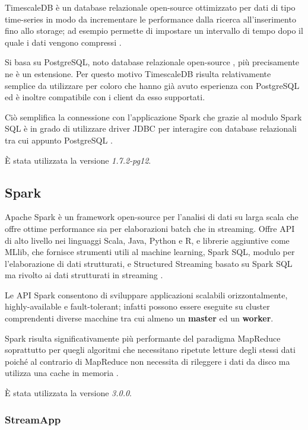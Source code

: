 TimescaleDB è un database relazionale open-source ottimizzato per dati di tipo time-series
in modo da incrementare le performance dalla ricerca
all'inserimento fino allo storage; ad esempio permette di impostare un intervallo di tempo
dopo il quale i dati vengono compressi \cite{timescale}.

Si basa su PostgreSQL, noto database relazionale open-source \cite{postgresql}, più precisamente
ne è un estensione. Per questo motivo TimescaleDB risulta relativamente semplice da utilizzare
per coloro che hanno già avuto esperienza con PostgreSQL ed è inoltre compatibile con i client
da esso supportati.

Ciò semplifica la connessione con l'applicazione Spark che grazie al modulo Spark SQL è in grado
di utilizzare driver JDBC per interagire con database relazionali tra cui appunto PostgreSQL
\cite{spark_sql}.

È stata utilizzata la versione \textit{1.7.2-pg12}.

\subsection{Spark}

Apache Spark è un framework open-source per l'analisi di dati su larga scala che offre ottime
performance sia per elaborazioni batch che in streaming. Offre API di alto livello nei linguaggi
Scala, Java, Python e R, e librerie aggiuntive come MLlib, che fornisce strumenti utili al
machine learning, Spark SQL, modulo per l'elaborazione di dati strutturati,
e Structured Streaming basato su Spark SQL ma rivolto ai dati strutturati in streaming \cite{spark}.

Le API Spark consentono di sviluppare applicazioni scalabili orizzontalmente, highly-available
e fault-tolerant; infatti possono
essere eseguite su cluster comprendenti diverse macchine tra cui almeno un \textbf{master} ed un
\textbf{worker}.

Spark risulta significativamente più performante del paradigma MapReduce soprattutto per quegli algoritmi
che necessitano ripetute letture degli stessi dati poiché al contrario di MapReduce non
necessita di rileggere i dati da disco ma utilizza una cache in memoria \cite{spark_mapred}.

È stata utilizzata la versione \textit{3.0.0}.

\subsubsection{StreamApp}


